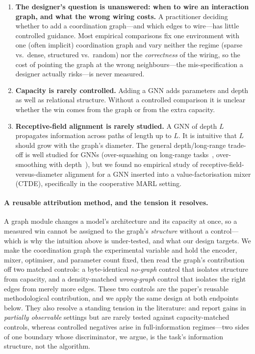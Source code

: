 \begin{enumerate}[leftmargin=*,itemsep=0pt,topsep=2pt]
  \item \textbf{The designer's question is unanswered: when to wire an
        interaction graph, and what the wrong wiring costs.} A practitioner
        deciding whether to add a coordination graph---and which edges to
        wire---has little controlled guidance. Most empirical comparisons
        fix one environment with one (often implicit) coordination graph and
        vary neither the regime (sparse vs.\ dense, structured vs.\ random) nor
        the \emph{correctness} of the wiring, so the cost of pointing the graph
        at the wrong neighbours---the mis-specification a designer actually
        risks---is never measured.
  \item \textbf{Capacity is rarely controlled.} Adding a GNN adds
        parameters and depth as well as relational structure. Without a
        controlled comparison it is unclear whether the win comes from the
        graph or from the extra capacity.
  \item \textbf{Receptive-field alignment is rarely studied.} A GNN of
        depth $L$ propagates information across paths of length up to $L$.
        It is intuitive that $L$ should grow with the graph's diameter. The
        general depth/long-range trade-off is well studied for GNNs
        (over-squashing on long-range tasks~\citep{alon_2021_oversquashing},
        over-smoothing with depth~\citep{li_2018_oversmoothing}), but we
        found no empirical study of receptive-field-versus-diameter alignment
        for a GNN inserted into a value-factorisation mixer (CTDE),
        specifically in the cooperative MARL setting.
\end{enumerate}

\paragraph{A reusable attribution method, and the tension it resolves.} A graph
module changes a model's architecture and its capacity at once, so a measured
win cannot be assigned to the graph's \emph{structure} without a control---which
is why the intuition above is under-tested, and what our design targets. We make
the coordination graph the experimental variable and hold the encoder, mixer,
optimiser, and parameter count fixed, then read the graph's contribution off two
matched controls: a byte-identical \emph{no-graph} control that isolates
structure from capacity, and a density-matched \emph{wrong-graph} control that
isolates the right edges from merely more edges. These two controls are the
paper's reusable methodological contribution, and we apply the same design at
both endpoints below. They also resolve a standing tension in the literature:
 and  report gains in \emph{partially observable}
settings but are rarely tested against capacity-matched controls, whereas
controlled negatives arise in full-information regimes---two sides of one
boundary whose discriminator, we argue, is the task's information structure, not
the algorithm.

